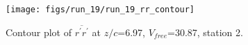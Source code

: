 \begin{figure}[H]
\centering
\texttt{[image: figs/run\_19/run\_19\_rr\_contour]}
\caption{Contour plot of $\overline{r^\prime r^\prime}$ at $z/c$=6.97, $V_{free}$=30.87, station 2.}
\label{fig:run_19_rr_contour}
\end{figure}


